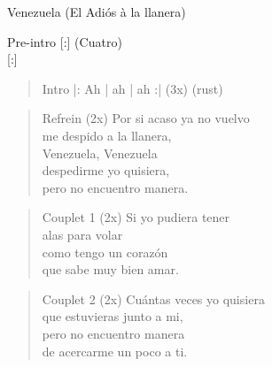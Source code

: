 \begin{song}[joropo]{Venezuela (El Adiós à la llanera)}
\begin{instrumental}{Pre-intro}
  [:] (Cuatro) \\
  \measure{}  \measure{}    [:]
\end{instrumental}

\begin{verse}{Intro}
|:  \hspace{1em}Ah \hspace{2em} | ah \hspace{2em} | ah \hspace{2em} :| (3x) \hspace{1em}  \hspace{1em}(rust)
\end{verse}

\begin{verse}{Refrein (2x)}
\chord{}Por si acaso ya no vuelvo\\
\chord{}me despido a la llanera,\\
Venezuela, Venezuela\\
despedirme yo quisiera,\\
pero no encuentro manera. \hspace{1em} \\
\end{verse}

\begin{verse}{Couplet 1 (2x)}
Si yo pudiera tener\\
alas para volar\\
como tengo un corazón\\
que sabe muy bien amar.\\
\end{verse}
\begin{verse}{Couplet 2 (2x)}
Cu\'{a}ntas veces yo quisiera\\
que estuvieras junto a mi,\\
pero no encuentro manera\\
de acercarme un poco a ti.\hspace{2em}
\end{verse}


\end{song}
